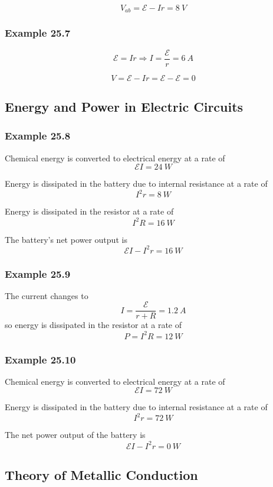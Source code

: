 \documentclass{article}
\begin{document}
\[V_{ab} = \mathcal{E} - I r = \qty{8}{V}\]

\subsubsection{Example 25.7}

\[\mathcal{E} = I r \Rightarrow I = \frac{\mathcal{E}}{r} = \qty{6}{A}\]

\[V = \mathcal{E} - I r = \mathcal{E} - \mathcal{E} = 0\]

\subsection{Energy and Power in Electric Circuits}

\subsubsection{Example 25.8}

Chemical energy is converted to electrical energy at a rate of \[\mathcal{E} I = \qty{24}{W}\]

Energy is dissipated in the battery due to internal resistance at a rate of \[I^2 r = \qty{8}{W}\]

Energy is dissipated in the resistor at a rate of \[I^2 R = \qty{16}{W}\]

The battery's net power output is \[\mathcal{E} I - I^2 r = \qty{16}{W}\]

\subsubsection{Example 25.9}

The current changes to \[I = \frac{\mathcal{E}}{r + R} = \qty{1.2}{A}\] so energy is dissipated in the resistor at a rate of \[P = I^2 R = \qty{12}{W}\]

\subsubsection{Example 25.10}

Chemical energy is converted to electrical energy at a rate of \[\mathcal{E} I = \qty{72}{W}\]

Energy is dissipated in the battery due to internal resistance at a rate of \[I^2 r = \qty{72}{W}\]

The net power output of the battery is \[\mathcal{E} I - I^2 r = \qty{0}{W}\]

\subsection{Theory of Metallic Conduction}
\end{document}
